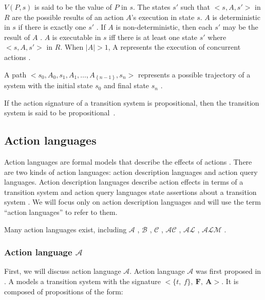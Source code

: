 $ V(P,s) $ is said to be the value of $ P $ in $ s $.
The states $ s' $ such that $ <s, A, s'> $ in $ R $ are the possible results of an action $ A $'s execution in state $ s $.
$ A $ is deterministic in $ s $ if there is exactly one $ s' $ \cite{gelfond_action_1998}.
If $ A $ is non-deterministic, then each $ s' $ may be the result of $ A $ \cite{blount_architecture_2013}.
$ A $ is executable in $ s $ iff there is at least one state $ s' $ where $ <s, A, s'> $ in $ R $.
When $ \left|A\right|>1 $, A represents the execution of concurrent actions \cite{gelfond_action_1998, blount_architecture_2013}.

A path $ <s_0, A_0, s_1, A_1, \ldots, A_{\left\{n-1\right\}}, s_n> $ represents a possible trajectory of a system with the initial state $ s_0 $ and final state $ s_n $ \cite{blount_architecture_2013}.

If the action signature of a transition system is propositional, then the transition system is said to be propositional~\cite{gelfond_action_1998}.

\subsection{Action languages}
\label{subsec:action_languages}

Action languages are formal models that describe the effects of actions \cite{gelfond_action_1998}.
There are two kinds of action languages: action description languages and action query languages.
Action description languages describe action effects in terms of a transition system and action query languages state assertions about a transition system \cite{gelfond_action_1998}.
We will focus only on action description languages and will use the term ``action languages'' to refer to them.

Many action languages exist, including $ \mathcal{A} $ \cite{gelfond_action_1998}, $ \mathcal{B} $ \cite{gelfond_action_1998}, $ \mathcal{C} $ \cite{gelfond_action_1998}, $ \mathcal{AC} $ \cite{turner_representing_1997}, $ \mathcal{AL} $ \cite{baral_reasoning_2000}, $ \mathcal{ALM} $ \cite{inclezan_modular_2016}.

\subsubsection{Action language $ \mathcal{A} $}
\label{subsubsec:action_language_a}

First, we will discuss action language $ \mathcal{A} $.
Action language $ \mathcal{A} $ was first proposed in \cite{pednault_formulating_1987}.
A models a transition system with the signature $ <\{t,\ f\},\ \boldsymbol{F},\ \boldsymbol{A}> $.
It is composed of propositions of the form:

